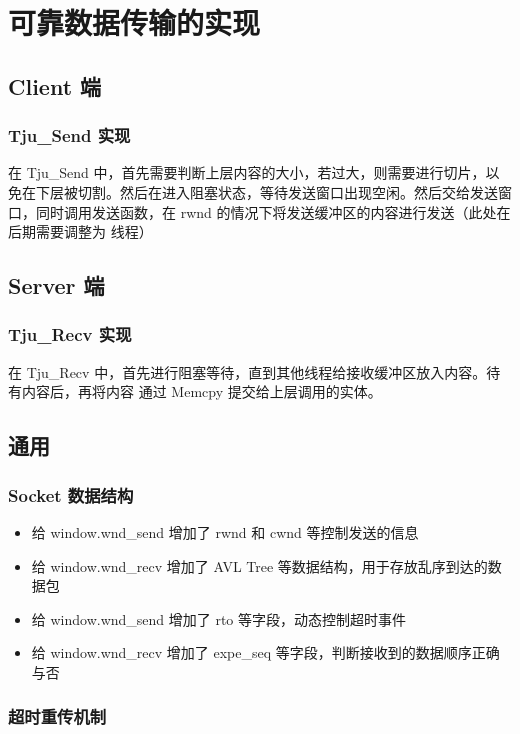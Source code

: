 \chapter{可靠数据传输的实现}

\section{Client 端}
\subsection{Tju\_Send 实现}

在 Tju\_Send 中，首先需要判断上层内容的大小，若过大，则需要进行切片，以免在下层被切割。然后在进入阻塞状态，等待发送窗口出现空闲。然后交给发送窗口，同时调用发送函数，在 rwnd 的情况下将发送缓冲区的内容进行发送（此处在后期需要调整为 线程）

\section{Server 端}
\subsection{Tju\_Recv 实现}
在 Tju\_Recv 中，首先进行阻塞等待，直到其他线程给接收缓冲区放入内容。待有内容后，再将内容 通过 Memcpy 提交给上层调用的实体。

\section{通用}
\subsection{Socket 数据结构}
\begin{itemize}
    \item 给 window.wnd\_send 增加了 rwnd 和 cwnd 等控制发送的信息
    \item 给 window.wnd\_recv 增加了 AVL Tree 等数据结构，用于存放乱序到达的数据包
    \item 给 window.wnd\_send 增加了 rto 等字段，动态控制超时事件
    \item 给 window.wnd\_recv 增加了 expe\_seq 等字段，判断接收到的数据顺序正确与否
\end{itemize}

\subsection{超时重传机制}

